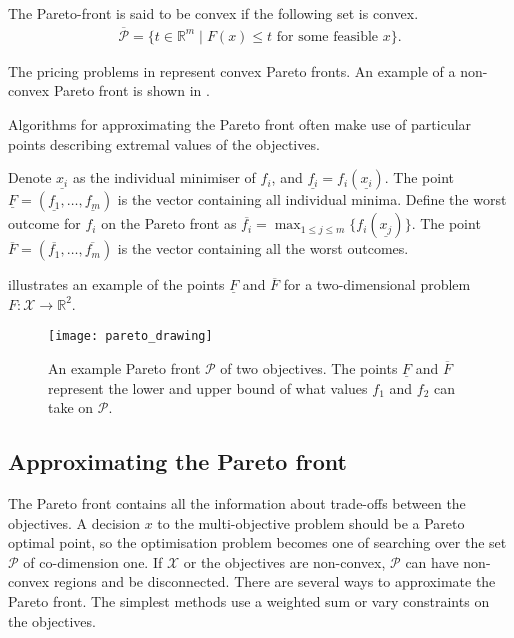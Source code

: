 \documentclass[main.tex]{subfiles}
\begin{document}
\begin{mydef}[Convexity]
  The Pareto-front is said to be convex if the following set is convex.
  \begin{align}
    \overline{\mathcal{P}} = \{t\in\mathbb{R}^m\mid F(x)\leq t \text{ for
    some feasible } x\}.
  \end{align}
\end{mydef}

\begin{example}[Convexity]
  The pricing problems in  represent convex Pareto
  fronts.
  An example of a non-convex Pareto front is shown in
  .
\end{example}

Algorithms for approximating the Pareto front
often make use of particular points describing extremal
values of the objectives.
\begin{mydef}
  Denote $\underline{x_i}$ as the individual minimiser of $f_i$, and
  $\underline{f_i}=f_i(\underline {x_i})$.
  The point $\underline{F}=(\underline{f_1},\dots,\underline{f_m})$
  is the vector containing all individual minima.
  Define the worst outcome for $f_i$ on the Pareto front as
  $\overline{f_i}=\max_{1\leq j\leq m}\{f_i(\underline{x_j})\}$.
  The point  $\overline{F} =
  (\overline{f_1}, \dots, \overline{f_m})$ is the vector containing
  all the worst outcomes.
\end{mydef}

\begin{example}
   illustrates an example of the points
  $\underline{F}$ and $\overline{F}$ %
  for a two-dimensional problem $F:\mathcal{X}\to\mathbb{R}^2$.
  \begin{figure}[htbp]
    \centering
    \texttt{[image: pareto\_drawing]}
    \caption{An example Pareto front $\mathcal{P}$ of two
      objectives. The points $\underline{F}$ and $\overline{F}$
      represent the
      lower and upper bound of what values
      $f_1$ and $f_2$ can take on $\mathcal{P}$.}\label{fig:pareto_drawing}
  \end{figure}
\end{example}

\subsection{Approximating the Pareto front}\label{sec:multi_pareto_front}
The Pareto front contains all the information about trade-offs between the
objectives. A decision $x$ to the multi-objective problem
should be a Pareto optimal point, so the
optimisation problem becomes one of searching over the set
$\mathcal{P}$ of co-dimension one. If $\mathcal{X}$ or the objectives are non-convex,
$\mathcal{P}$ can have non-convex regions and be
disconnected.
There are several ways to approximate the Pareto front. The simplest
methods use a weighted sum or vary constraints on the objectives.
\end{document}
